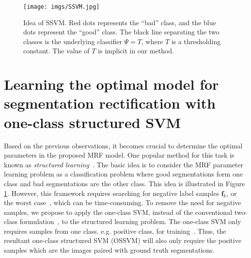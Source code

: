 \documentclass[10pt,journal,compsoc]{newIEEEtran}
\begin{document}
\begin{figure}[t]
  \centering
  \texttt{[image: imgs/SSVM.jpg]}
  \caption{Idea of SSVM. Red dots represents the ``bad'' class, and the blue dots represent the ``good'' class. The black line separating the two classes is the underlying classifier $\Psi=T$, where $T$ is a thresholding constant. The value of $T$ is implicit in our method.}\label{fig:SSVM}
\end{figure}\section{Learning the optimal model for segmentation rectification with one-class structured SVM}\label{SEC:OSSVM}

Based on the previous observations, it becomes crucial to determine the optimal parameters in the proposed MRF model. One popular method for this task is known as 
\emph{structured learning}~\cite{Taskar05LargeMargin,Tsochantaridis05LargeMarginSSVM,Szummer08LearnCRFbyGC,Joachims2009CuttingPlaneSSVM}. The basic idea is to consider the MRF parameter learning problem as a classification problem where good segmentations form one class and bad segmentations are the other class. This idea is illustrated in Figure \ref{fig:SSVM}. However, this framework requires searching for negative label samples $\mathbf{f}_k$, or the worst case~\cite{Taskar05LargeMargin,Tsochantaridis05LargeMarginSSVM,Szummer08LearnCRFbyGC,Joachims2009CuttingPlaneSSVM}, which can be time-consuming. To remove the need for negative samples, we propose to apply the one-class SVM, instead of the conventional two-class formulation~\cite{Taskar05LargeMargin}, to the structured learning problem. The one-class SVM only requires samples from one class, e.g. positive class, for training~\cite{Scholkopf01oneclassSVM,chen2001one,manevitz2002one}. Thus, the resultant one-class structured SVM (OSSVM) will also only require the positive samples which are the images paired with ground truth segmentations. 
\end{document}
